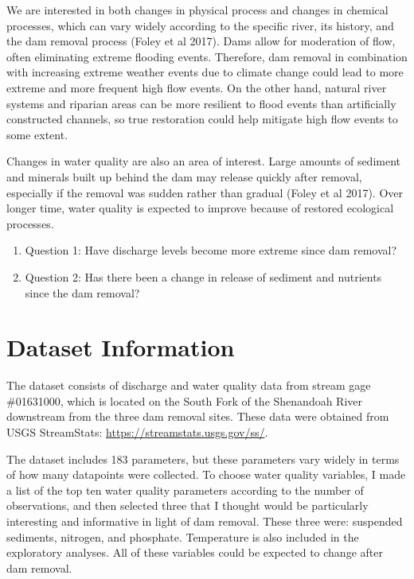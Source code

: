\documentclass[
  12pt,
]{article}
\begin{document}
We are interested in both changes in physical process and changes in
chemical processes, which can vary widely according to the specific
river, its history, and the dam removal process (Foley et al 2017). Dams
allow for moderation of flow, often eliminating extreme flooding events.
Therefore, dam removal in combination with increasing extreme weather
events due to climate change could lead to more extreme and more
frequent high flow events. On the other hand, natural river systems and
riparian areas can be more resilient to flood events than artificially
constructed channels, so true restoration could help mitigate high flow
events to some extent.

Changes in water quality are also an area of interest. Large amounts of
sediment and minerals built up behind the dam may release quickly after
removal, especially if the removal was sudden rather than gradual (Foley
et al 2017). Over longer time, water quality is expected to improve
because of restored ecological processes.

\begin{enumerate}
\def\labelenumi{\arabic{enumi}.}
\item
  Question 1: Have discharge levels become more extreme since dam
  removal?
\item
  Question 2: Has there been a change in release of sediment and
  nutrients since the dam removal?
\end{enumerate}

\newpage

\hypertarget{dataset-information}{%
\section{Dataset Information}\label{dataset-information}}

The dataset consists of discharge and water quality data from stream
gage \#01631000, which is located on the South Fork of the Shenandoah
River downstream from the three dam removal sites. These data were
obtained from USGS StreamStats: \url{https://streamstats.usgs.gov/ss/}.

The dataset includes 183 parameters, but these parameters vary widely in
terms of how many datapoints were collected. To choose water quality
variables, I made a list of the top ten water quality parameters
according to the number of observations, and then selected three that I
thought would be particularly interesting and informative in light of
dam removal. These three were: suspended sediments, nitrogen, and
phosphate. Temperature is also included in the exploratory analyses. All
of these variables could be expected to change after dam removal.
\end{document}
